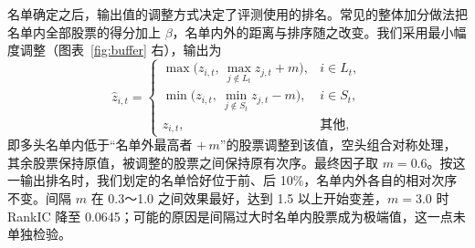 \documentclass[UTF8,a4paper,zihao=-4,fontset=none]{ctexart}
\begin{document}
名单确定之后，输出值的调整方式决定了评测使用的排名。常见的整体加分做法把名单内全部股票的得分加上 $\beta$，名单内外的距离与排序随之改变。我们采用最小幅度调整（图表~\ref{fig:buffer} 右），输出为
\begin{equation}
\hat z_{i,t}=\begin{cases}
\max\big(z_{i,t},\ \max_{j\notin L_t} z_{j,t}+m\big), & i\in L_t,\\[2pt]
\min\big(z_{i,t},\ \min_{j\notin S_t} z_{j,t}-m\big), & i\in S_t,\\[2pt]
z_{i,t}, & \text{其他},
\end{cases}
\end{equation}
即多头名单内低于“名单外最高者 $+\,m$”的股票调整到该值，空头组合对称处理，其余股票保持原值，被调整的股票之间保持原有次序。最终因子取 $m=0.6$。按这一输出排名时，我们划定的名单恰好位于前、后 10\%，名单内外各自的相对次序不变。间隔 $m$ 在 0.3～1.0 之间效果最好，达到 1.5 以上开始变差，$m=3.0$ 时 RankIC 降至 0.0645；可能的原因是间隔过大时名单内股票成为极端值，这一点未单独检验。
\end{document}
